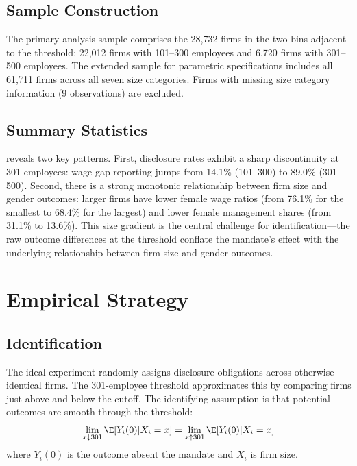\documentclass[12pt]{article}
\begin{document}
\subsection{Sample Construction}

The primary analysis sample comprises the 28,732 firms in the two bins adjacent to the threshold: 22,012 firms with 101--300 employees and 6,720 firms with 301--500 employees. The extended sample for parametric specifications includes all 61,711 firms across all seven size categories. Firms with missing size category information (9 observations) are excluded.

\subsection{Summary Statistics}



 reveals two key patterns. First, disclosure rates exhibit a sharp discontinuity at 301 employees: wage gap reporting jumps from 14.1\% (101--300) to 89.0\% (301--500). Second, there is a strong monotonic relationship between firm size and gender outcomes: larger firms have lower female wage ratios (from 76.1\% for the smallest to 68.4\% for the largest) and lower female management shares (from 31.1\% to 13.6\%). This size gradient is the central challenge for identification---the raw outcome differences at the threshold conflate the mandate's effect with the underlying relationship between firm size and gender outcomes.


\section{Empirical Strategy}
\label{sec:strategy}

\subsection{Identification}

The ideal experiment randomly assigns disclosure obligations across otherwise identical firms. The 301-employee threshold approximates this by comparing firms just above and below the cutoff. The identifying assumption is that potential outcomes are smooth through the threshold:
\begin{equation}
\lim_{x \downarrow 301} \E[Y_i(0) | X_i = x] = \lim_{x \uparrow 301} \E[Y_i(0) | X_i = x]
\end{equation}
where $Y_i(0)$ is the outcome absent the mandate and $X_i$ is firm size.
\end{document}
